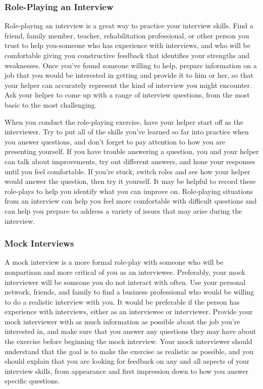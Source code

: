 \subsubsection*{Role-Playing an Interview}
\break Role-playing an interview is a great way to practice your interview skills. Find a friend, family member, teacher, rehabilitation professional, or other person you trust to help you-someone who has experience with interviews, and who will be comfortable giving you constructive feedback that identifies your strengths and weaknesses. Once you've found someone willing to help, prepare information on a job that you would be interested in getting and provide it to him or her, so that your helper can accurately represent the kind of interview you might encounter. Ask your helper to come up with a range of interview questions, from the most basic to the most challenging.

When you conduct the role-playing exercise, have your helper start off as the interviewer. Try to put all of the skills you've learned so far into practice when you answer questions, and don't forget to pay attention to how you are presenting yourself. If you have trouble answering a question, you and your helper can talk about improvements, try out different answers, and hone your responses until you feel comfortable. If you're stuck, switch roles and see how your helper would answer the question, then try it yourself. It may be helpful to record these role-plays to help you identify what you can improve on. Role-playing situations from an interview can help you feel more comfortable with difficult questions and can help you prepare to address a variety of issues that may arise during the interview.

\subsubsection*{Mock Interviews}
\break A mock interview is a more formal role-play with someone who will be nonpartisan and more critical of you as an interviewee. Preferably, your mock interviewer will be someone you do not interact with often. Use your personal network, friends, and family to find a business professional who would be willing to do a realistic interview with you. It would be preferable if the person has experience with interviews, either as an interviewee or interviewer. Provide your mock interviewer with as much information as possible about the job you're interested in, and make sure that you answer any questions they may have about the exercise before beginning the mock interview. Your mock interviewer should understand that the goal is to make the exercise as realistic as possible, and you should explain that you are looking for feedback on any and all aspects of your interview skills, from appearance and first impression down to how you answer specific questions.

